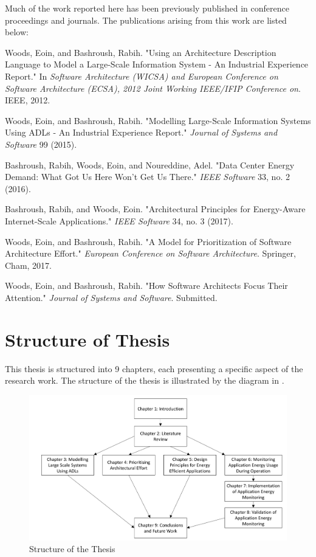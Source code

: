 Much of the work reported here has been previously published in conference proceedings and journals. The publications arising from this work are listed below: \nopagebreak
\begin{description}
	\item Woods, Eoin, and Bashroush, Rabih. "Using an Architecture Description Language to Model a Large-Scale Information System - An Industrial Experience Report." In \emph{Software Architecture (WICSA) and European Conference on Software Architecture (ECSA), 2012 Joint Working IEEE/IFIP Conference on}. IEEE, 2012.
	\item Woods, Eoin, and Bashroush, Rabih. "Modelling Large-Scale Information Systems Using ADLs - An Industrial Experience Report." \emph{Journal of Systems and Software} 99 (2015).
	\item Bashroush, Rabih, Woods, Eoin, and Noureddine, Adel. "Data Center Energy Demand: What Got Us Here Won't Get Us There." \emph{IEEE Software} 33, no. 2 (2016).
	\item Bashroush, Rabih, and Woods, Eoin. "Architectural Principles for Energy-Aware Internet-Scale Applications." \emph{IEEE Software} 34, no. 3 (2017).
	\item Woods, Eoin, and Bashroush, Rabih. "A Model for Prioritization of Software Architecture Effort." \emph{European Conference on Software Architecture}. Springer, Cham, 2017.
	\item Woods, Eoin, and Bashroush, Rabih. "How Software Architects Focus Their Attention." \emph{Journal of Systems and Software}.  Submitted.
\end{description}


\section{Structure of Thesis}

This thesis is structured into 9 chapters, each presenting a specific aspect of the research work.  The structure of the thesis is illustrated by the diagram in .

\begin{figure}[h]
\centering
\includegraphics[width=1.0\textwidth]{Figures/intro-chapters}
\caption{Structure of the Thesis}
\label{figure:intro-chapters}
\end{figure}

